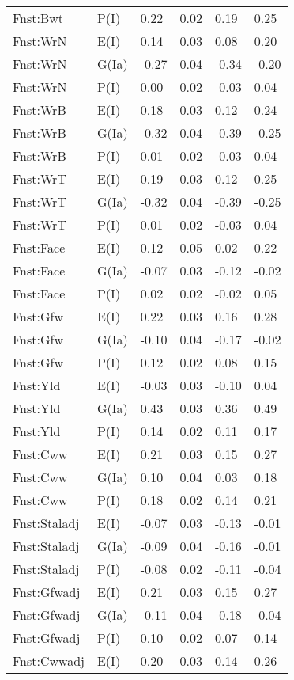 \begin{center}
\begin{longtable}{|p{1.1in}|p{0.7in}|p{0.7in}|p{0.6in}|p{0.6in}|p{0.6in}|}
  Fnst:Bwt & P(I) & 0.22 & 0.02 & 0.19 & 0.25 \\ 
  Fnst:WrN & E(I) & 0.14 & 0.03 & 0.08 & 0.20 \\ 
  Fnst:WrN & G(Ia) & -0.27 & 0.04 & -0.34 & -0.20 \\ 
  Fnst:WrN & P(I) & 0.00 & 0.02 & -0.03 & 0.04 \\ 
  Fnst:WrB & E(I) & 0.18 & 0.03 & 0.12 & 0.24 \\ 
  Fnst:WrB & G(Ia) & -0.32 & 0.04 & -0.39 & -0.25 \\ 
  Fnst:WrB & P(I) & 0.01 & 0.02 & -0.03 & 0.04 \\ 
  Fnst:WrT & E(I) & 0.19 & 0.03 & 0.12 & 0.25 \\ 
  Fnst:WrT & G(Ia) & -0.32 & 0.04 & -0.39 & -0.25 \\ 
  Fnst:WrT & P(I) & 0.01 & 0.02 & -0.03 & 0.04 \\ 
  Fnst:Face & E(I) & 0.12 & 0.05 & 0.02 & 0.22 \\ 
  Fnst:Face & G(Ia) & -0.07 & 0.03 & -0.12 & -0.02 \\ 
  Fnst:Face & P(I) & 0.02 & 0.02 & -0.02 & 0.05 \\ 
  Fnst:Gfw & E(I) & 0.22 & 0.03 & 0.16 & 0.28 \\ 
  Fnst:Gfw & G(Ia) & -0.10 & 0.04 & -0.17 & -0.02 \\ 
  Fnst:Gfw & P(I) & 0.12 & 0.02 & 0.08 & 0.15 \\ 
  Fnst:Yld & E(I) & -0.03 & 0.03 & -0.10 & 0.04 \\ 
  Fnst:Yld & G(Ia) & 0.43 & 0.03 & 0.36 & 0.49 \\ 
  Fnst:Yld & P(I) & 0.14 & 0.02 & 0.11 & 0.17 \\ 
  Fnst:Cww & E(I) & 0.21 & 0.03 & 0.15 & 0.27 \\ 
  Fnst:Cww & G(Ia) & 0.10 & 0.04 & 0.03 & 0.18 \\ 
  Fnst:Cww & P(I) & 0.18 & 0.02 & 0.14 & 0.21 \\ 
  Fnst:Staladj & E(I) & -0.07 & 0.03 & -0.13 & -0.01 \\ 
  Fnst:Staladj & G(Ia) & -0.09 & 0.04 & -0.16 & -0.01 \\ 
  Fnst:Staladj & P(I) & -0.08 & 0.02 & -0.11 & -0.04 \\ 
  Fnst:Gfwadj & E(I) & 0.21 & 0.03 & 0.15 & 0.27 \\ 
  Fnst:Gfwadj & G(Ia) & -0.11 & 0.04 & -0.18 & -0.04 \\ 
  Fnst:Gfwadj & P(I) & 0.10 & 0.02 & 0.07 & 0.14 \\ 
  Fnst:Cwwadj & E(I) & 0.20 & 0.03 & 0.14 & 0.26 \\ 

\end{longtable}
\end{center}
